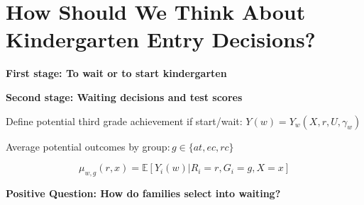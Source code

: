 \documentclass[t,aspectratio=169,11pt,presentation]{beamer}
\newenvironment{wideitemize}{\itemize\addtolength{\itemsep}{14pt}}{\enditemize}
\begin{document}

\section{How Should We Think About Kindergarten Entry Decisions?}


	\begin{frame}[label=wait1]{\textbf{First stage: To wait or to start kindergarten } }
		
    
    \begin{figure}
        \centering
        \begin{scaletikzpicturetowidth}{\textwidth}
        
        \end{scaletikzpicturetowidth}
    \end{figure}
		
		
	\vfill
	\hyperlink{model1}{}  
	\hyperlink{whywaiting}{}  
	\hyperlink{treatments}{}  

		
		
	\end{frame}
	

	\begin{frame}{\textbf{Second stage: Waiting decisions and test scores}}
		\begin{wideitemize}
			
			\item Define potential third grade achievement if start/wait: $Y(w)=Y_w(X,r,U,\gamma_w)$
			
			\item<2-> Average potential outcomes by group$: g\in\{at, ec, rc\}$

			\[  \mu_{w,g}(r,x) = \mathbb{E}[Y_i(w)|R_i=r,G_i=g,X=x] \]
				
		\begin{center}
			
		\end{center}	
				
				
			\item<7-> {\color{ptr5}\textbf{Positive Question: How do families select into waiting? 	}}
				
			\hypertarget<7>{wait2}{}
				

		\end{wideitemize}
		

		
		
		\hyperlink{model2}{}
	\end{frame}
	
\end{document}
